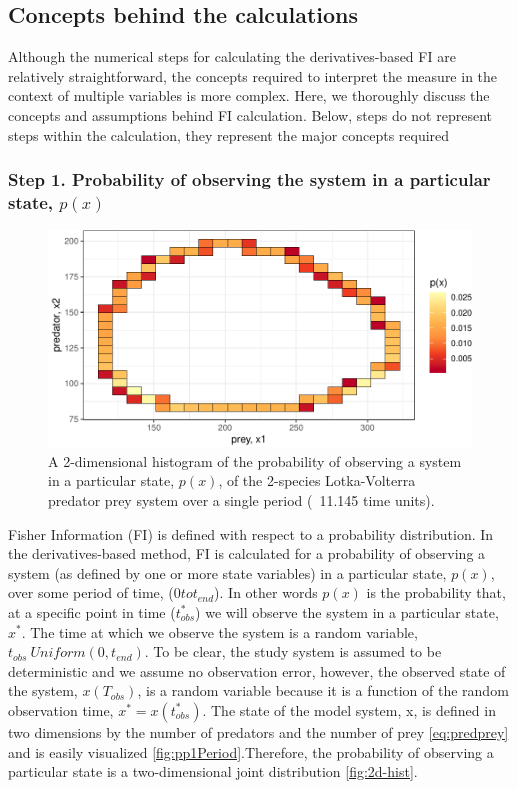 \documentclass[12pt,twoside,openany]{reedthesis}
\begin{document}
\subsection{Concepts behind the
calculations}\label{concepts-behind-the-calculations}

Although the numerical steps for calculating the derivatives-based FI
are relatively straightforward, the concepts required to interpret the
measure in the context of multiple variables is more complex. Here, we
thoroughly discuss the concepts and assumptions behind FI calculation.
Below, steps do not represent steps within the calculation, they
represent the major concepts required

\subsubsection{\texorpdfstring{\textbf{Step 1. Probability of observing
the system in a particular state,
\(p(x)\)}}{Step 1. Probability of observing the system in a particular state, p(x)}}\label{step-1.-probability-of-observing-the-system-in-a-particular-state-px}
\begin{figure}
\includegraphics[width=0.85\linewidth]{_myDissertation_files/figure-latex/2D-hist-1} \caption{A 2-dimensional histogram of the probability of observing a system in a particular state, $p(x)$, of the 2-species Lotka-Volterra predator prey system over a single period (~11.145 time units).}\label{fig:2D-hist}
\end{figure}
Fisher Information (FI) is defined with respect to a probability
distribution. In the derivatives-based method, FI is calculated for a
probability of observing a system (as defined by one or more state
variables) in a particular state, \(p(x)\), over some period of time,
(\(0 to t_{end}\)). In other words \(p(x)\) is the probability that, at
a specific point in time (\(t_{obs}^*\)) we will observe the system in a
particular state, \(x^*\). The time at which we observe the system is a
random variable, \(t_{obs} ~ Uniform(0,t_{end})\). To be clear, the
study system is assumed to be deterministic and we assume no observation
error, however, the observed state of the system, \(x(T_{obs})\), is a
random variable because it is a function of the random observation time,
\(x^*= x(t_{obs}^*)\). The state of the model system, x, is defined in
two dimensions by the number of predators and the number of prey
\eqref{eq:predprey} and is easily visualized
\ref{fig:pp1Period}.Therefore, the probability of observing a particular
state is a two-dimensional joint distribution \ref{fig:2d-hist}.
\end{document}
